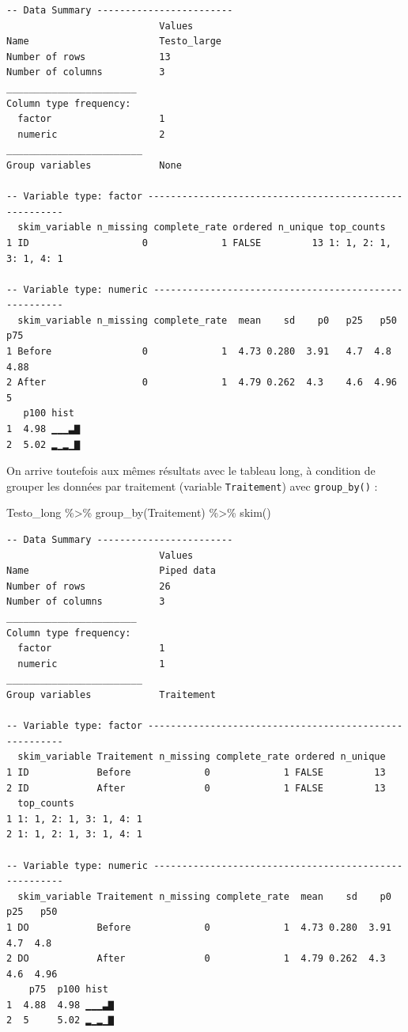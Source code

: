 \documentclass[
  a4paper,
]{article}
\newenvironment{Shaded}{\begin{snugshade}}{\end{snugshade}}
\newcommand{\FunctionTok}[1]{\textcolor[rgb]{0.39,0.29,0.61}{#1}}
\newcommand{\NormalTok}[1]{\textcolor[rgb]{0.12,0.11,0.11}{#1}}
\newcommand{\SpecialCharTok}[1]{\textcolor[rgb]{0.24,0.68,0.91}{#1}}
\begin{document}
\begin{verbatim}
-- Data Summary ------------------------
                           Values     
Name                       Testo_large
Number of rows             13         
Number of columns          3          
_______________________               
Column type frequency:                
  factor                   1          
  numeric                  2          
________________________              
Group variables            None       

-- Variable type: factor -------------------------------------------------------
  skim_variable n_missing complete_rate ordered n_unique top_counts            
1 ID                    0             1 FALSE         13 1: 1, 2: 1, 3: 1, 4: 1

-- Variable type: numeric ------------------------------------------------------
  skim_variable n_missing complete_rate  mean    sd    p0   p25   p50   p75
1 Before                0             1  4.73 0.280  3.91   4.7  4.8   4.88
2 After                 0             1  4.79 0.262  4.3    4.6  4.96  5   
   p100 hist 
1  4.98 ▁▁▁▃▇
2  5.02 ▂▁▂▁▇
\end{verbatim}

On arrive toutefois aux mêmes résultats avec le tableau long, à condition de grouper les données par traitement (variable \texttt{Traitement}) avec \texttt{group\_by()} :

\begin{Shaded}
\begin{Highlighting}[]
\NormalTok{Testo\_long }\SpecialCharTok{\%\textgreater{}\%} 
  \FunctionTok{group\_by}\NormalTok{(Traitement) }\SpecialCharTok{\%\textgreater{}\%} 
  \FunctionTok{skim}\NormalTok{()}
\end{Highlighting}
\end{Shaded}

\begin{verbatim}
-- Data Summary ------------------------
                           Values    
Name                       Piped data
Number of rows             26        
Number of columns          3         
_______________________              
Column type frequency:               
  factor                   1         
  numeric                  1         
________________________             
Group variables            Traitement

-- Variable type: factor -------------------------------------------------------
  skim_variable Traitement n_missing complete_rate ordered n_unique
1 ID            Before             0             1 FALSE         13
2 ID            After              0             1 FALSE         13
  top_counts            
1 1: 1, 2: 1, 3: 1, 4: 1
2 1: 1, 2: 1, 3: 1, 4: 1

-- Variable type: numeric ------------------------------------------------------
  skim_variable Traitement n_missing complete_rate  mean    sd    p0   p25   p50
1 DO            Before             0             1  4.73 0.280  3.91   4.7  4.8 
2 DO            After              0             1  4.79 0.262  4.3    4.6  4.96
    p75  p100 hist 
1  4.88  4.98 ▁▁▁▃▇
2  5     5.02 ▂▁▂▁▇
\end{verbatim}
\end{document}
